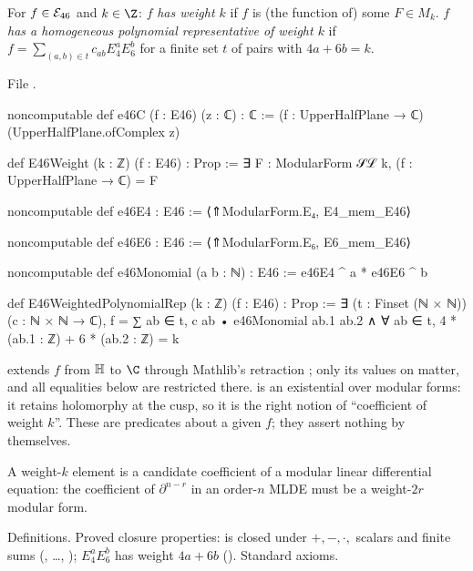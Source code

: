 \begin{definition}\label{l14:def:E46Weight}
For $f\in\mathcal{E}_{46}$ and $k\in\Z$: $f$ \emph{has weight $k$} if $f$ is (the function of) some $F\in M_k$. $f$ \emph{has a
homogeneous polynomial representative of weight $k$} if $f = \sum_{(a,b)\in t}c_{ab}E_4^aE_6^b$ for a finite set $t$ of
pairs with $4a+6b = k$.
\end{definition}
\noindent File .
\begin{leancode}
noncomputable def e46C (f : E46) (z : ℂ) : ℂ :=
  (f : UpperHalfPlane → ℂ) (UpperHalfPlane.ofComplex z)

def E46Weight (k : ℤ) (f : E46) : Prop :=
  ∃ F : ModularForm 𝒮ℒ k, (f : UpperHalfPlane → ℂ) = F

noncomputable def e46E4 : E46 := ⟨⇑ModularForm.E₄, E4_mem_E46⟩

noncomputable def e46E6 : E46 := ⟨⇑ModularForm.E₆, E6_mem_E46⟩

noncomputable def e46Monomial (a b : ℕ) : E46 := e46E4 ^ a * e46E6 ^ b

def E46WeightedPolynomialRep (k : ℤ) (f : E46) : Prop :=
  ∃ (t : Finset (ℕ × ℕ)) (c : ℕ × ℕ → ℂ),
    f = ∑ ab ∈ t, c ab • e46Monomial ab.1 ab.2 ∧
      ∀ ab ∈ t, 4 * (ab.1 : ℤ) + 6 * (ab.2 : ℤ) = k
\end{leancode}
\begin{dictionary}
 extends $f$ from $\mathbb{H}$ to $\C$ through Mathlib's retraction ; only its values on
 matter, and all equalities below are restricted there.  is an existential over modular forms:
it retains holomorphy at the cusp, so it is the right notion of ``coefficient of weight $k$''. These are predicates about a
given $f$; they assert nothing by themselves.
\end{dictionary}
\begin{physics}
A weight-$k$ element is a candidate coefficient of a modular linear differential equation: the coefficient of
$\partial^{n-r}$ in an order-$n$ MLDE must be a weight-$2r$ modular form.
\end{physics}
\begin{status}
Definitions. Proved closure properties:  is closed under $+,-,\cdot,$ scalars and finite sums
(, \dots, ); $E_4^aE_6^b$ has weight $4a+6b$ (). Standard axioms.
\end{status}

